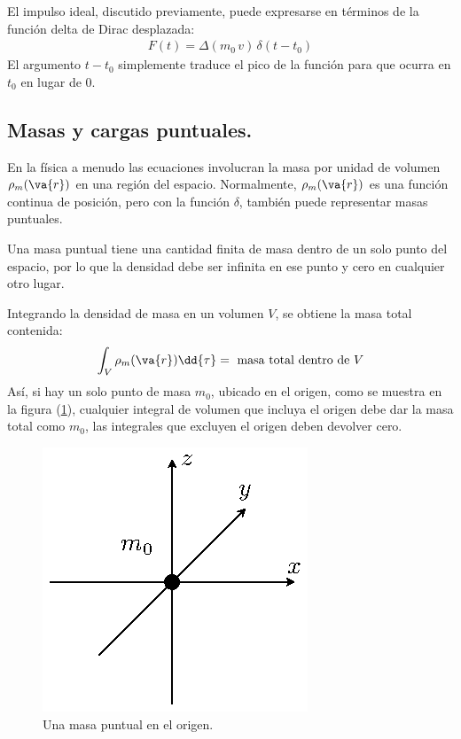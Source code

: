 El impulso ideal, discutido previamente, puede expresarse en términos de la función delta de Dirac desplazada:
\begin{align}
F(t) = \Delta (m_{0} \, v) \, \delta (t - t_{0})
\label{eq:ecuacion_05_04}
\end{align}
El argumento $t - t_{0}$ simplemente traduce el pico de la función para que ocurra en $t_{0}$ en lugar de $0$.

\subsection{Masas y cargas puntuales.}

En la física a menudo las ecuaciones involucran la masa por unidad de volumen $\rho_{m} (\va{r})$ en una región del espacio. Normalmente, $\rho_{m} (\va{r})$ es una función continua de posición, pero con la función $\delta$, también puede representar masas puntuales.
\par
Una masa puntual tiene una cantidad finita de masa dentro de un solo punto del espacio, por lo que la densidad debe ser infinita en ese punto y cero en cualquier otro lugar.
\par
Integrando la densidad de masa en un volumen $V$, se obtiene la masa total contenida:
\begin{align}
\int_{V} \rho_{m} (\va{r}) \dd{\tau} = \mbox{ masa total dentro de } V
\label{eq:ecuacion_05_05}
\end{align}
Así, si hay un solo punto de masa $m_{0}$, ubicado en el origen, como se muestra en la figura (\ref{fig:figura_05_04}), cualquier integral de volumen que incluya el origen debe dar la masa total como $m_{0}$, las integrales que excluyen el origen deben devolver cero. 
\begin{figure}[H]
    \centering
    \includegraphics[scale=1.3]{Imagenes/delta_Dirac_Masa_Puntual.eps}
    \caption{Una masa puntual en el origen.}
    \label{fig:figura_05_04}
\end{figure}


